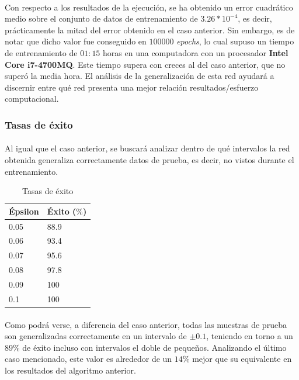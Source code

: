 \documentclass[12pt, twocolumn]{article}
\begin{document}
	\paragraph{} Con respecto a los resultados de la ejecución, se ha obtenido un error cuadrático medio sobre el conjunto de datos de entrenamiento de $3.26*10^{-4}$, es decir, prácticamente la mitad del error obtenido en el caso anterior. Sin embargo, es de notar que dicho valor fue conseguido en $100000$ \textit{epochs}, lo cual supuso un tiempo de entrenamiento de $01:15$ horas en una computadora con un procesador \textbf{Intel Core i7-4700MQ}. Este tiempo supera con creces al del caso anterior, que no superó la media hora. El análisis de la generalización de esta red ayudará a discernir entre qué red presenta una mejor relación resultados/esfuerzo computacional. 
	
	\subsubsection{Tasas de éxito}
	
	\paragraph{} Al igual que el caso anterior, se buscará analizar dentro de qué intervalos la red obtenida generaliza correctamente datos de prueba, es decir, no vistos durante el entrenamiento. 
	
	\begin{table}[H]
		\centering
		\begin{tabular}{ll}
			\hline
			Épsilon & Éxito ($\%$)\\ \hline
			0.05     & 88.9  \\
			0.06     & 93.4    \\
			0.07     & 95.6  \\
			0.08     & 97.8  \\
			0.09     & 100  \\
			0.1      & 100  \\ \hline
		\end{tabular}
		\caption{Tasas de éxito}
		\label{ex2}
	\end{table}
	
	\paragraph{} Como podrá verse, a diferencia del caso anterior, todas las muestras de prueba son generalizadas correctamente en un intervalo de $\pm 0.1$, teniendo en torno a un $89\%$ de éxito incluso con intervalos el doble de pequeños. Analizando el último caso mencionado, este valor es alrededor de un $14\%$ mejor que su equivalente en los resultados del algoritmo anterior. 
	
\end{document}
